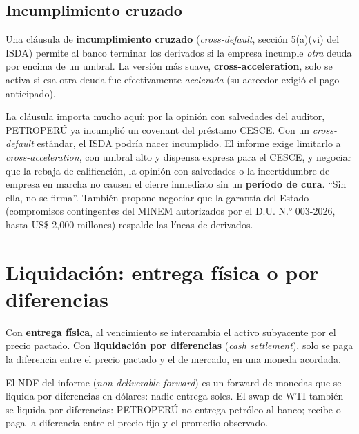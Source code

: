 \subsection{Incumplimiento cruzado}

\begin{definicion}
Una cláusula de \textbf{incumplimiento cruzado} (\emph{cross-default}, sección 5(a)(vi) del ISDA) permite al banco terminar los derivados si la empresa incumple \emph{otra} deuda por encima de un umbral. La versión más suave, \textbf{cross-acceleration}, solo se activa si esa otra deuda fue efectivamente \emph{acelerada} (su acreedor exigió el pago anticipado).
\end{definicion}

\begin{informe}
La cláusula importa mucho aquí: por la opinión con salvedades del auditor, PETROPERÚ ya incumplió un covenant del préstamo CESCE. Con un \emph{cross-default} estándar, el ISDA podría nacer incumplido. El informe exige limitarlo a \emph{cross-acceleration}, con umbral alto y dispensa expresa para el CESCE, y negociar que la rebaja de calificación, la opinión con salvedades o la incertidumbre de empresa en marcha no causen el cierre inmediato sin un \textbf{período de cura}. \enquote{Sin ella, no se firma}. También propone negociar que la garantía del Estado (compromisos contingentes del MINEM autorizados por el D.U. N.° 003-2026, hasta US\$ 2,000 millones) respalde las líneas de derivados.
\end{informe}

\section{Liquidación: entrega física o por diferencias}

\begin{definicion}
Con \textbf{entrega física}, al vencimiento se intercambia el activo subyacente por el precio pactado. Con \textbf{liquidación por diferencias} (\emph{cash settlement}), solo se paga la diferencia entre el precio pactado y el de mercado, en una moneda acordada.
\end{definicion}

El NDF del informe (\emph{non-deliverable forward}) es un forward de monedas que se liquida por diferencias en dólares: nadie entrega soles. El swap de WTI también se liquida por diferencias: PETROPERÚ no entrega petróleo al banco; recibe o paga la diferencia entre el precio fijo y el promedio observado.

